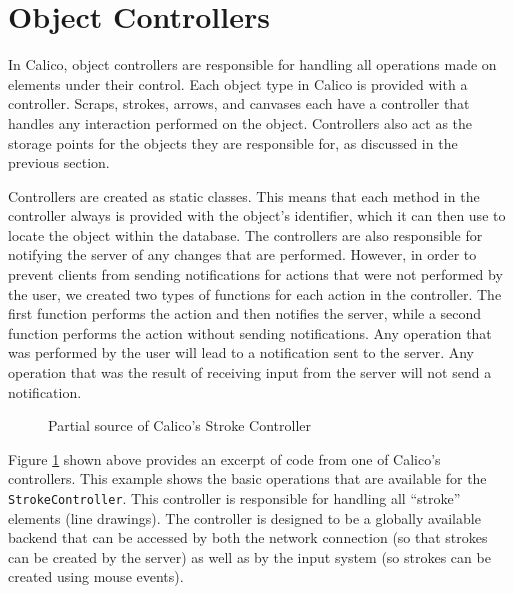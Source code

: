 \section{Object Controllers}
In Calico, object controllers are responsible for handling all operations made on elements under their control. Each object type in Calico is provided with a controller.
Scraps, strokes, arrows, and canvases each have a controller that handles any interaction performed on the object. 
Controllers also act as the storage points for the objects they are responsible for, as discussed in the previous section.

Controllers are created as static classes. This means that each method in the controller always is provided with the object's identifier, which it can then use to locate the object within the database. 
The controllers are also responsible for notifying the server of any changes that are performed. However, in order to prevent clients from sending notifications for actions that were not performed by the user, we created two types of functions for each action in the controller. The first function performs the action and then notifies the server, while a second function performs the action without sending notifications. Any operation that was performed by the user will lead to a notification sent to the server. Any operation that was the result of receiving input from the server will not send a notification.

\begin{figure}[htb]
  \centering
  \small
  
  \normalsize
  \caption{Partial source of Calico's Stroke Controller}
  \label{code:controller}
\end{figure}

Figure \ref{code:controller} shown above provides an excerpt of code from one of Calico's controllers. This example shows the basic operations that are available for the \texttt{StrokeController}. This controller is responsible for handling all ``stroke'' elements (line drawings). The controller is designed to be a globally available backend that can be accessed by both the network connection (so that strokes can be created by the server) as well as by the input system (so strokes can be created using mouse events). 

